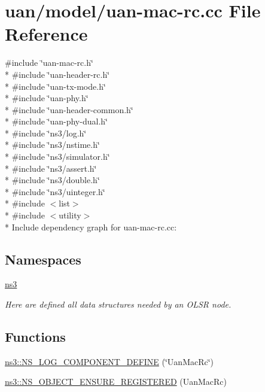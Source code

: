 \hypertarget{uan-mac-rc_8cc}{}\section{uan/model/uan-\/mac-\/rc.cc File Reference}
\label{uan-mac-rc_8cc}
{\ttfamily \#include \char`\"{}uan-\/mac-\/rc.\+h\char`\"{}}\\*
{\ttfamily \#include \char`\"{}uan-\/header-\/rc.\+h\char`\"{}}\\*
{\ttfamily \#include \char`\"{}uan-\/tx-\/mode.\+h\char`\"{}}\\*
{\ttfamily \#include \char`\"{}uan-\/phy.\+h\char`\"{}}\\*
{\ttfamily \#include \char`\"{}uan-\/header-\/common.\+h\char`\"{}}\\*
{\ttfamily \#include \char`\"{}uan-\/phy-\/dual.\+h\char`\"{}}\\*
{\ttfamily \#include \char`\"{}ns3/log.\+h\char`\"{}}\\*
{\ttfamily \#include \char`\"{}ns3/nstime.\+h\char`\"{}}\\*
{\ttfamily \#include \char`\"{}ns3/simulator.\+h\char`\"{}}\\*
{\ttfamily \#include \char`\"{}ns3/assert.\+h\char`\"{}}\\*
{\ttfamily \#include \char`\"{}ns3/double.\+h\char`\"{}}\\*
{\ttfamily \#include \char`\"{}ns3/uinteger.\+h\char`\"{}}\\*
{\ttfamily \#include $<$list$>$}\\*
{\ttfamily \#include $<$utility$>$}\\*
Include dependency graph for uan-\/mac-\/rc.cc\+:
\subsection*{Namespaces}
\begin{DoxyCompactItemize}
\item 
 \hyperlink{namespacens3}{ns3}
\begin{DoxyCompactList}\small\item\em Here are defined all data structures needed by an O\+L\+SR node. \end{DoxyCompactList}\end{DoxyCompactItemize}
\subsection*{Functions}
\begin{DoxyCompactItemize}
\item 
\hyperlink{namespacens3_a42a4f126e40a4c17495a80bcbfff3363}{ns3\+::\+N\+S\+\_\+\+L\+O\+G\+\_\+\+C\+O\+M\+P\+O\+N\+E\+N\+T\+\_\+\+D\+E\+F\+I\+NE} (\char`\"{}Uan\+Mac\+Rc\char`\"{})
\item 
\hyperlink{namespacens3_a212d0db597e69c8e4bbcb1089176fccf}{ns3\+::\+N\+S\+\_\+\+O\+B\+J\+E\+C\+T\+\_\+\+E\+N\+S\+U\+R\+E\+\_\+\+R\+E\+G\+I\+S\+T\+E\+R\+ED} (Uan\+Mac\+Rc)
\end{DoxyCompactItemize}
